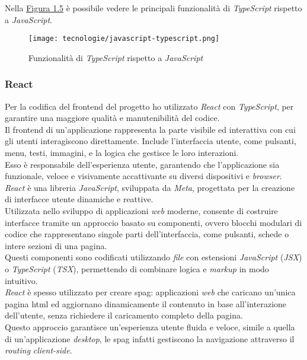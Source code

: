 \noindent Nella {\hyperref[fig:javacript-typescript]{Figura 1.5}} è possibile vedere le principali funzionalità di \textit{TypeScript} rispetto a \textit{JavaScript}.

\begin{figure}[H]
    \label{fig:javacript-typescript}
    \centering
    \texttt{[image: tecnologie/javascript-typescript.png]}
    \caption{Funzionalità di \textit{TypeScript} rispetto a \textit{JavaScript}}
    \cite{site:js-ts}
\end{figure}

\subsubsection{React}

\noindent Per la codifica del \gls{frontend} del progetto ho utilizzato \textit{React} con \textit{TypeScript}, per garantire una maggiore qualità e manutenibilità del codice.\\
Il \gls{frontend} di un’applicazione rappresenta la parte visibile ed interattiva con cui gli utenti interagiscono direttamente.
Include l’interfaccia utente, come pulsanti, menu, testi, immagini, e la logica che gestisce le loro interazioni.\\
Esso è responsabile dell’esperienza utente, garantendo che l’applicazione sia funzionale, veloce e visivamente accattivante su diversi dispositivi e \textit{browser}.\\

\noindent \textit{React} è una libreria \textit{JavaScript}, sviluppata da \textit{Meta}, progettata per la creazione di interfacce utente dinamiche e reattive. \\
Utilizzata nello sviluppo di applicazioni \textit{web} moderne, consente di costruire interfacce tramite un approccio basato su componenti,
ovvero blocchi modulari di codice che rappresentano singole parti dell’interfaccia, come pulsanti, schede o intere sezioni di una pagina.\\
Questi componenti sono codificati utilizzando \textit{file} con estensioni \textit{JavaScript} (\textit{JSX}) o \textit{TypeScript} (\textit{TSX}), permettendo di combinare logica e \textit{markup} in modo intuitivo.\\

\noindent \textit{React} è spesso utilizzato per creare \gls{spag}: applicazioni \textit{web} che caricano un'unica pagina \gls{html} ed aggiornano dinamicamente il contenuto in base all’interazione dell’utente, senza richiedere il caricamento completo della pagina.\\ 
Questo approccio garantisce un’esperienza utente fluida e veloce, simile a quella di un’applicazione \textit{desktop}, le \gls{spag} infatti gestiscono la navigazione attraverso il \textit{routing} \textit{client-side}.\\

